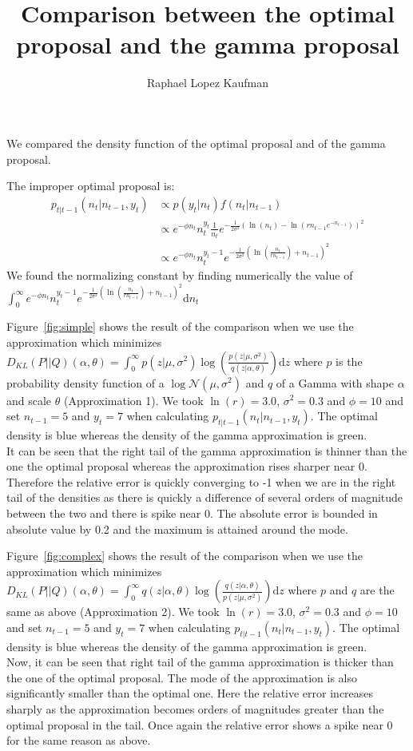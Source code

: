 \documentclass{article}
\title{Comparison between the optimal proposal and the gamma proposal}
\author{Raphael Lopez Kaufman}
\date{}
\begin{document}
We compared the density function of the optimal proposal and of the gamma proposal.

The improper optimal proposal is:
\begin{equation*}
\begin{split}
p_{t|t-1}(n_t|n_{t-1}, y_t) & \propto  p(y_t|n_t)f(n_t|n_{t-1}) \\
& \propto e^{-\phi n_t}n_t^{y_t}\frac{1}{n_t} e^{-\frac{1}{2\sigma^2}(\ln(n_t)-\ln(rn_{t-1}e^{-n_{t-1}}))^2} \\
& \propto e^{-\phi n_t}n_t^{y_t-1}e^{-\frac{1}{2\sigma^2}(\ln(\frac{n_t}{rn_{t-1}})+n_{t-1})^2}
\end{split}
\end{equation*}
We found the normalizing constant by finding numerically the value of $\int_{0}^{\infty}e^{-\phi n_t}n_t^{y_t-1}e^{-\frac{1}{2\sigma^2}(\ln(\frac{n_t}{rn_{t-1}})+n_{t-1})^2} \mathrm{d}n_t$

Figure~\ref{fig:simple} shows the result of the comparison when we use the approximation which minimizes $D_{KL}(P||Q)(\alpha, \theta) = \int_{0}^{\infty}{p(z|\mu, \sigma^2)\log(\frac{p(z|\mu, \sigma^2)}{q(z|\alpha, \theta)})\mathrm{d}z}$
where $p$ is the probability density function of a $\log\mathcal{N}(\mu, \sigma^2)$ and $q$ of a Gamma with shape $\alpha$ and scale $\theta$ (Approximation 1). We took $\ln(r) = 3.0$, $\sigma^2 = 0.3$ and $\phi = 10$ and set $n_{t-1} = 5$ and $y_t = 7$ when calculating $p_{t|t-1}(n_t|n_{t-1}, y_t)$. The optimal density is blue whereas the density of the gamma approximation is green. \\
It can be seen that the right tail of the gamma approximation is thinner than the one the optimal proposal whereas the approximation rises sharper near 0. Therefore the relative error is quickly converging to -1 when we are in the right tail of the densities as there is quickly a difference of several orders of magnitude between the two and there is spike near 0. The absolute error is bounded in absolute value by 0.2 and the maximum is attained around the mode. 

Figure~\ref{fig:complex} shows the result of the comparison when we use the approximation which minimizes $	D_{KL}(P||Q)(\alpha, \theta) = \int_{0}^{\infty}{q(z|\alpha, \theta)\log(\frac{q(z|\alpha, \theta)}{p(z|\mu, \sigma^2)})\mathrm{d}z}$
where $p$ and $q$ are the same as above (Approximation 2). We took $\ln(r) = 3.0$, $\sigma^2 = 0.3$ and $\phi = 10$ and set $n_{t-1} = 5$ and $y_t = 7$ when calculating $p_{t|t-1}(n_t|n_{t-1}, y_t)$. The optimal density is blue whereas the density of the gamma approximation is green. \\
Now, it can be seen that right tail of the gamma approximation is thicker than the one of the optimal proposal. The mode of the approximation is also significantly smaller than the optimal one. Here the relative error increases sharply as the approximation becomes orders of magnitudes greater than the optimal proposal in the tail. Once again the relative error shows a spike near 0 for the same reason as above.
\end{document}
